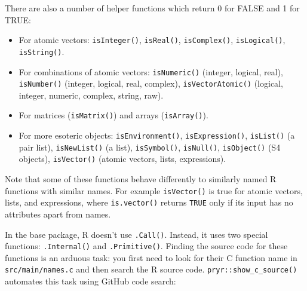 \begin{Shaded}
\begin{Highlighting}[]
\StringTok{ }\NormalTok{(}\NormalTok{(} \NormalTok{=}\NormalTok{), }
\NormalTok{)}
\NormalTok{(}\NormalTok{)}
\NormalTok{(}\NormalTok{)}
\end{Highlighting}
\end{Shaded}

There are also a number of helper functions which return 0 for FALSE and
1 for TRUE:

\begin{itemize}
\item
  For atomic vectors: \texttt{isInteger()}, \texttt{isReal()},
  \texttt{isComplex()}, \texttt{isLogical()}, \texttt{isString()}.
\item
  For combinations of atomic vectors: \texttt{isNumeric()} (integer,
  logical, real), \texttt{isNumber()} (integer, logical, real, complex),
  \texttt{isVectorAtomic()} (logical, integer, numeric, complex, string,
  raw).
\item
  For matrices (\texttt{isMatrix()}) and arrays (\texttt{isArray()}).
\item
  For more esoteric objects: \texttt{isEnvironment()},
  \texttt{isExpression()}, \texttt{isList()} (a pair list),
  \texttt{isNewList()} (a list), \texttt{isSymbol()}, \texttt{isNull()},
  \texttt{isObject()} (S4 objects), \texttt{isVector()} (atomic vectors,
  lists, expressions).
\end{itemize}

Note that some of these functions behave differently to similarly named
R functions with similar names. For example \texttt{isVector()} is true
for atomic vectors, lists, and expressions, where \texttt{is.vector()}
returns \texttt{TRUE} only if its input has no attributes apart from
names.


In the base package, R doesn't use \texttt{.Call()}. Instead, it uses
two special functions: \texttt{.Internal()} and \texttt{.Primitive()}.
Finding the source code for these functions is an arduous task: you
first need to look for their C function name in
\texttt{src/main/names.c} and then search the R source code.
\texttt{pryr::show\_c\_source()} automates this task using GitHub code
search:  

